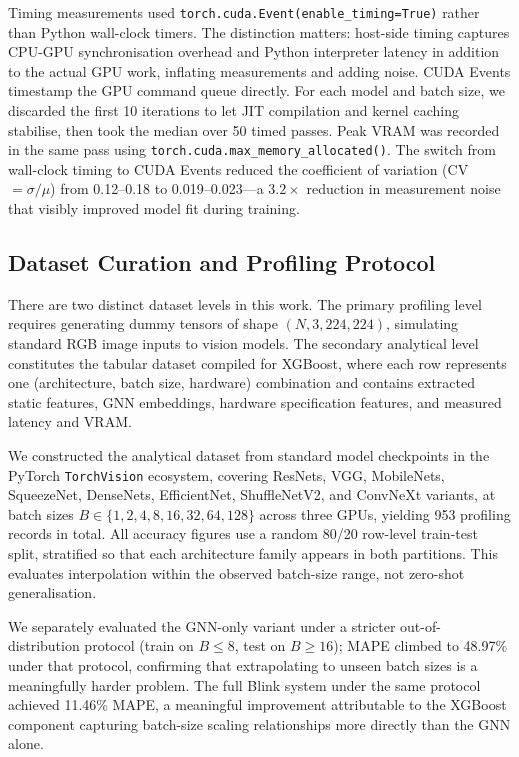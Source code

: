 \documentclass[conference]{IEEEtran}
\begin{document}
Timing measurements used \texttt{torch.cuda.Event(enable\_timing=True)} rather
than Python wall-clock timers. The distinction matters: host-side timing
captures CPU-GPU synchronisation overhead and Python interpreter latency in
addition to the actual GPU work, inflating measurements and adding noise.
CUDA Events timestamp the GPU command queue directly. For each model and batch
size, we discarded the first 10 iterations to let JIT compilation and kernel
caching stabilise, then took the median over 50 timed passes. Peak VRAM was
recorded in the same pass using \texttt{torch.cuda.max\_memory\_allocated()}.
The switch from wall-clock timing to CUDA Events reduced the coefficient of
variation (CV $= \sigma/\mu$) from 0.12--0.18 to 0.019--0.023---a $3.2\times$
reduction in measurement noise that visibly improved model fit during training.

\subsection{Dataset Curation and Profiling Protocol}

There are two distinct dataset levels in this work. The primary profiling level
requires generating dummy tensors of shape $(N, 3, 224, 224)$, simulating
standard RGB image inputs to vision models. The secondary analytical level
constitutes the tabular dataset compiled for XGBoost, where each row represents
one (architecture, batch size, hardware) combination and contains extracted
static features, GNN embeddings, hardware specification features, and measured
latency and VRAM.

We constructed the analytical dataset from standard model checkpoints in the
PyTorch \texttt{TorchVision} ecosystem, covering ResNets, VGG, MobileNets,
SqueezeNet, DenseNets, EfficientNet, ShuffleNetV2, and ConvNeXt variants, at
batch sizes $B \in \{1, 2, 4, 8, 16, 32, 64, 128\}$ across three GPUs, yielding
953 profiling records in total. All accuracy figures use a random 80/20
row-level train-test split, stratified so that each architecture family appears
in both partitions. This evaluates interpolation within the observed batch-size
range, not zero-shot generalisation.

We separately evaluated the GNN-only variant under a stricter out-of-distribution
protocol (train on $B \leq 8$, test on $B \geq 16$); MAPE climbed to 48.97\%
under that protocol, confirming that extrapolating to unseen batch sizes is a
meaningfully harder problem. The full Blink system under the same protocol
achieved 11.46\% MAPE, a meaningful improvement attributable to the XGBoost
component capturing batch-size scaling relationships more directly than the GNN
alone.
\end{document}

